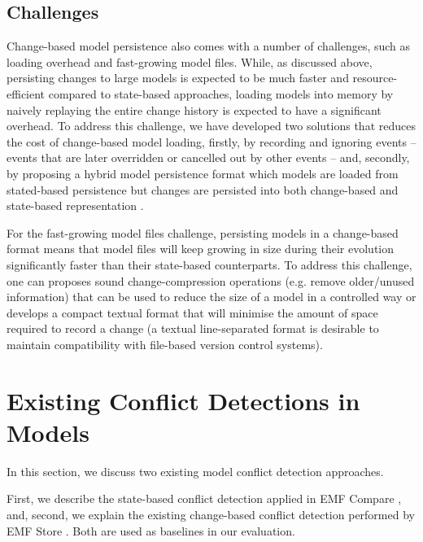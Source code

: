 \subsection{Challenges}
\label{sec:challenges}
Change-based model persistence also comes with a number of challenges, such as loading overhead and fast-growing model files. While, as discussed above, persisting changes to large models is expected to be much faster and resource-efficient compared to state-based approaches, loading models into memory by naively replaying the entire change history is expected to have a significant overhead. To address this challenge, we have developed two solutions that reduces the cost of change-based model loading, firstly, by recording and ignoring events -- events that are later overridden or cancelled out by other events -- \cite{yohannis2018towards} and, secondly, by proposing a hybrid model persistence format which models are loaded from stated-based persistence but changes are persisted into both change-based and state-based representation \cite{DBLP:conf/models/YohannisRPK18}. 

For the fast-growing model files challenge, persisting models in a change-based format means that model files will keep growing in size during their evolution significantly faster than their state-based counterparts. To address this challenge, one can proposes sound change-compression operations (e.g. remove older/unused information) that can be used to reduce the size of a model in a controlled way or develops a compact textual format that will minimise the amount of space required to record a change (a textual line-separated format is desirable to maintain compatibility with file-based version control systems).  

\section{Existing Conflict Detections in Models}
\label{sec:existing_conflict_detections}
In this section, we discuss two existing model conflict detection approaches. 

First, we describe the state-based conflict detection applied in EMF Compare \cite{emfcompare2018developer}, and, second, we explain the existing change-based conflict detection performed by EMF Store \cite{emfstore2019what,koegel2010operation}. Both are used as baselines in our evaluation.

